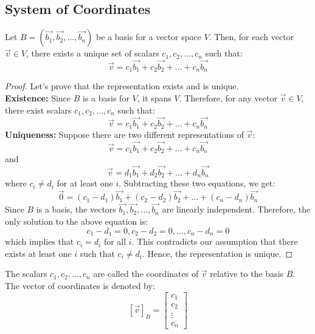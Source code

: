 \subsection{System of Coordinates}
\begin{theorem}
    Let $B = (\vec{b_1}, \vec{b_2}, \ldots, \vec{b_n})$ be a basis for a vector space $V$. Then, for each vector $\vec{v} \in V$, there exists a unique set of scalars $c_1, c_2, \ldots, c_n$ such that:
    \[ \vec{v} = c_1 \vec{b_1} + c_2 \vec{b_2} + \ldots + c_n \vec{b_n} \]
\end{theorem}
\begin{proof}
    Let's prove that the representation exists and is unique. \\
    \textbf{Existence:} Since $B$ is a basis for $V$, it spans $V$. Therefore, for any vector $\vec{v} \in V$, there exist scalars $c_1, c_2, \ldots, c_n$ such that:
    \[ \vec{v} = c_1 \vec{b_1} + c_2 \vec{b_2} + \ldots + c_n \vec{b_n} \]
    \textbf{Uniqueness:} Suppose there are two different representations of $\vec{v}$:
    \[ \vec{v} = c_1 \vec{b_1} + c_2 \vec{b_2} + \ldots + c_n \vec{b_n} \]
    and
    \[ \vec{v} = d_1 \vec{b_1} + d_2 \vec{b_2} + \ldots + d_n \vec{b_n} \]
    where $c_i \neq d_i$ for at least one $i$. Subtracting these two equations, we get:
    \[ \vec{0} = (c_1 - d_1) \vec{b_1} + (c_2 - d_2) \vec{b_2} + \ldots + (c_n - d_n) \vec{b_n} \]
    Since $B$ is a basis, the vectors $\vec{b_1}, \vec{b_2}, \ldots, \vec{b_n}$ are linearly independent. Therefore, the only solution to the above equation is:
    \[ c_1 - d_1 = 0, c_2 - d_2 = 0, \ldots, c_n - d_n = 0 \]
    which implies that $c_i = d_i$ for all $i$. This contradicts our assumption that there exists at least one $i$ such that $c_i \neq d_i$. Hence, the representation is unique.
\end{proof}

\begin{definition}
    The scalars $c_1, c_2, \ldots, c_n$ are called the coordinates of $\vec{v}$ relative to the basis $B$. The vector of coordinates is denoted by:
    \[ [\vec{v}]_B = \begin{bmatrix}
        c_1 \\ c_2 \\ \vdots \\ c_n
    \end{bmatrix} \]
\end{definition}

